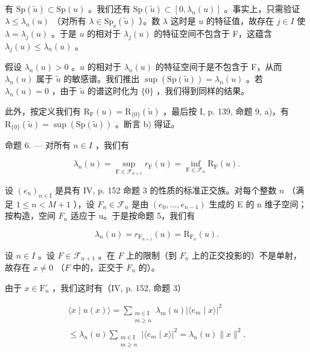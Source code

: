 有 \(\mathrm{Sp}(\widetilde{u})\subset \mathrm{Sp}(u)\) 。我们还有 \(\mathrm{Sp}(\widetilde{u})\subset [0,\lambda_n(u)]\) 。事实上，只需验证 \(\lambda \leqslant \lambda_{n}(u)\) （对所有 \(\lambda \in \mathrm{Sp}_{\mathrm{s}}(\widetilde{u})\) ）。数 \(\lambda\) 这时是 \(u\) 的特征值，故存在 \(j\in I\) 使 \(\lambda = \lambda_j(u)\) 。于是 \(u\) 的相对于 \(\lambda_{j}(u)\) 的特征空间不包含于 F，这蕴含 \(\lambda_{j}(u)\leqslant \lambda_{n}(u)\) 。

假设 \(\lambda_n(u) > 0\) 。\(u\) 的相对于 \(\lambda_n(u)\) 的特征空间于是不包含于 F，从而 \(\lambda_n(u)\) 属于 \(\widetilde{u}\) 的敏感谱。我们推出 \(\sup (\mathrm{Sp}(\widetilde{u})) = \lambda_n(u)\) 。若 \(\lambda_n(u) = 0\) ，由于 \(\widetilde{u}\) 的谱这时化为 \(\{0\}\) ，我们得到同样的结果。

此外，按定义我们有 \(\mathrm{R}_{\mathrm{F}}(u)=\mathrm{R}_{\{0\}}(\widetilde{u})\) ，最后按 I, p. 139, 命题 9, a)，有 \(\mathrm{R}_{\{0\}}(\widetilde{u})=\sup(\mathrm{Sp}(\widetilde{u}))\) 。断言 b) 得证。

命题 6. --- 对所有 \(n \in I\) ，我们有

\[
\lambda_ {n} (u) = \sup _ {\mathrm{F} \in \mathscr {F} _ {n + 1}} r _ {\mathrm{F}} (u) = \inf _ {\mathrm{F} \in \mathscr {F} _ {n}} \mathrm{R} _ {\mathrm{F}} (u).
\]

设 \((e_{n})_{n\in\mathrm{I}}\) 是具有 IV, p. 152 命题 3 的性质的标准正交族。对每个整数 \(n\) （满足 \(1\leqslant n<M+1\) ），设 \(F_{n}\in\mathcal{F}_{n}\) 是由 \((e_{0},\ldots,e_{n-1})\) 生成的 E 的 n 维子空间；按构造，空间 \(F_{n}\) 适应于 u。于是按命题 5，我们有

\[
\lambda_ {n} (u) = r _ {\mathrm{F} _ {n + 1}} (u) = \mathrm{R} _ {\mathrm{F} _ {n}} (u).\tag{2}
\]

设 \(n \in I\) 。设 \(F \in \mathcal{F}_{n+1}\) 。在 \(F\) 上的限制（到 \(F_n\) 上的正交投影的）不是单射，故存在 \(x \neq 0\) （\(F\) 中的，正交于 \(F_n\) 的）。

由于 \(x \in \mathrm{F}_{n}^{\circ}\) ，我们这时有（IV, p. 152, 命题 3）

\[
\begin{array}{l}\langle x\mid u(x)\rangle = \sum_{\substack{m\in \mathrm{I}\\ m\geqslant n}}\lambda_{m}(u)|\langle e_{m}\mid x\rangle |^{2}\\ \leqslant \lambda_{n}(u)\sum_{\substack{m\in \mathrm{I}\\ m\geqslant n}}|\langle e_{m}\mid x\rangle |^{2} = \lambda_{n}(u)\| x\|^{2}. \end{array}
\]

